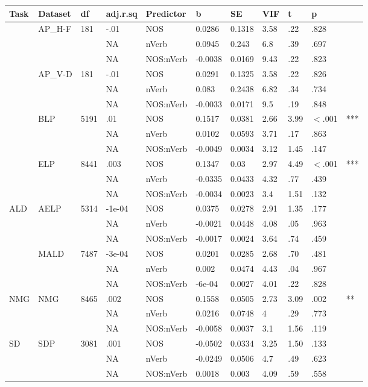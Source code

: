 \begin{table}[ht]
\centering
\begingroup\normalsize
\begin{tabular}{lllllllllll}
  \hline
Task & Dataset & df & adj.r.sq & Predictor & b & SE & VIF & t & p &  \\ 
  \hline
 & AP\_H-F & 181 & -.01 & NOS & 0.0286 & 0.1318 & 3.58 & .22 & .828 &   \\ 
   &  &  & NA & nVerb & 0.0945 & 0.243 & 6.8 & .39 & .697 &   \\ 
   &  &  & NA & NOS:nVerb & -0.0038 & 0.0169 & 9.43 & .22 & .823 &   \\ 
   & AP\_V-D & 181 & -.01 & NOS & 0.0291 & 0.1325 & 3.58 & .22 & .826 &   \\ 
   &  &  & NA & nVerb & 0.083 & 0.2438 & 6.82 & .34 & .734 &   \\ 
   &  &  & NA & NOS:nVerb & -0.0033 & 0.0171 & 9.5 & .19 & .848 &   \\ 
   & BLP & 5191 & .01 & NOS & 0.1517 & 0.0381 & 2.66 & 3.99 & $<$.001 & *** \\ 
   &  &  & NA & nVerb & 0.0102 & 0.0593 & 3.71 & .17 & .863 &   \\ 
   &  &  & NA & NOS:nVerb & -0.0049 & 0.0034 & 3.12 & 1.45 & .147 &   \\ 
   & ELP & 8441 & .003 & NOS & 0.1347 & 0.03 & 2.97 & 4.49 & $<$.001 & *** \\ 
   &  &  & NA & nVerb & -0.0335 & 0.0433 & 4.32 & .77 & .439 &   \\ 
   &  &  & NA & NOS:nVerb & -0.0034 & 0.0023 & 3.4 & 1.51 & .132 &   \\ 
  ALD & AELP & 5314 & -1e-04 & NOS & 0.0375 & 0.0278 & 2.91 & 1.35 & .177 &   \\ 
   &  &  & NA & nVerb & -0.0021 & 0.0448 & 4.08 & .05 & .963 &   \\ 
   &  &  & NA & NOS:nVerb & -0.0017 & 0.0024 & 3.64 & .74 & .459 &   \\ 
   & MALD & 7487 & -3e-04 & NOS & 0.0201 & 0.0285 & 2.68 & .70 & .481 &   \\ 
   &  &  & NA & nVerb & 0.002 & 0.0474 & 4.43 & .04 & .967 &   \\ 
   &  &  & NA & NOS:nVerb & -6e-04 & 0.0027 & 4.01 & .22 & .828 &   \\ 
  NMG & NMG & 8465 & .002 & NOS & 0.1558 & 0.0505 & 2.73 & 3.09 & .002 & ** \\ 
   &  &  & NA & nVerb & 0.0216 & 0.0748 & 4 & .29 & .773 &   \\ 
   &  &  & NA & NOS:nVerb & -0.0058 & 0.0037 & 3.1 & 1.56 & .119 &   \\ 
  SD & SDP & 3081 & .001 & NOS & -0.0502 & 0.0334 & 3.25 & 1.50 & .133 &   \\ 
   &  &  & NA & nVerb & -0.0249 & 0.0506 & 4.7 & .49 & .623 &   \\ 
   &  &  & NA & NOS:nVerb & 0.0018 & 0.003 & 4.09 & .59 & .558 &   \\ 
   \hline
\end{tabular}
\endgroup
\end{table}
